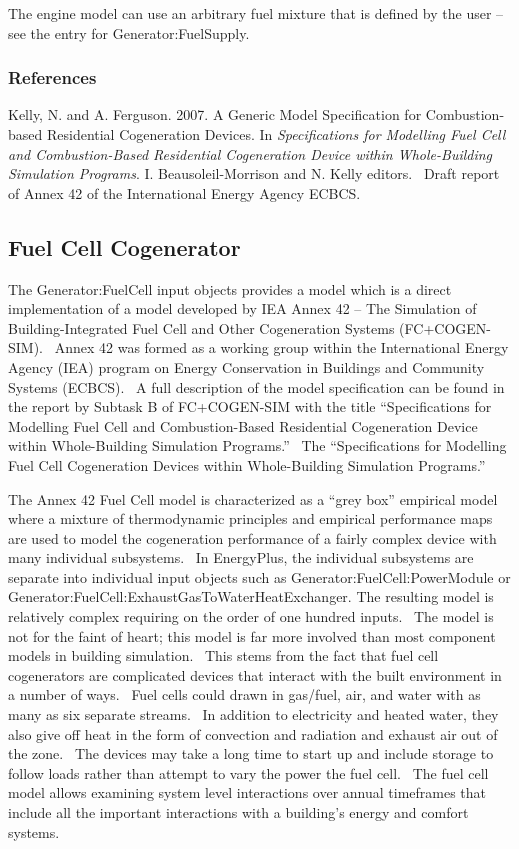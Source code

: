 The engine model can use an arbitrary fuel mixture that is defined by the user -- see the entry for Generator:FuelSupply.

\subsubsection{References}\label{references-024}

Kelly, N. and A. Ferguson. 2007. A Generic Model Specification for Combustion-based Residential Cogeneration Devices. In \emph{Specifications for Modelling Fuel Cell and Combustion-Based Residential Cogeneration Device within Whole-Building Simulation Programs}. I. Beausoleil-Morrison and N. Kelly editors.~ Draft report of Annex 42 of the International Energy Agency ECBCS.

\subsection{Fuel Cell Cogenerator}\label{fuel-cell-cogenerator}

The Generator:FuelCell input objects provides a model which is a direct implementation of a model developed by IEA Annex 42 -- The Simulation of Building-Integrated Fuel Cell and Other Cogeneration Systems (FC+COGEN-SIM).~ Annex 42 was formed as a working group within the International Energy Agency (IEA) program on Energy Conservation in Buildings and Community Systems (ECBCS).~ A full description of the model specification can be found in the report by Subtask B of FC+COGEN-SIM with the title ``Specifications for Modelling Fuel Cell and Combustion-Based Residential Cogeneration Device within Whole-Building Simulation Programs.''~ The ``Specifications for Modelling Fuel Cell Cogeneration Devices within Whole-Building Simulation Programs.''

The Annex 42 Fuel Cell model is characterized as a ``grey box'' empirical model where a mixture of thermodynamic principles and empirical performance maps are used to model the cogeneration performance of a fairly complex device with many individual subsystems.~ In EnergyPlus, the individual subsystems are separate into individual input objects such as Generator:FuelCell:PowerModule or Generator:FuelCell:ExhaustGasToWaterHeatExchanger. The resulting model is relatively complex requiring on the order of one hundred inputs.~ The model is not for the faint of heart; this model is far more involved than most component models in building simulation.~ This stems from the fact that fuel cell cogenerators are complicated devices that interact with the built environment in a number of ways.~ Fuel cells could drawn in gas/fuel, air, and water with as many as six separate streams.~ In addition to electricity and heated water, they also give off heat in the form of convection and radiation and exhaust air out of the zone.~ The devices may take a long time to start up and include storage to follow loads rather than attempt to vary the power the fuel cell.~ The fuel cell model allows examining system level interactions over annual timeframes that include all the important interactions with a building's energy and comfort systems.

